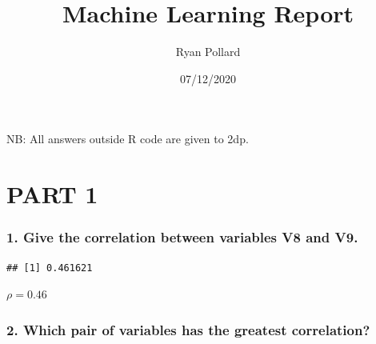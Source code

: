 \documentclass[
  8pt,
]{article}
\title{Machine Learning Report}
\author{Ryan Pollard}
\date{07/12/2020}
\newenvironment{Shaded}{\begin{snugshade}}{\end{snugshade}}
\newcommand{\KeywordTok}[1]{\textcolor[rgb]{0.13,0.29,0.53}{\textbf{#1}}}
\newcommand{\NormalTok}[1]{#1}
\newcommand{\OperatorTok}[1]{\textcolor[rgb]{0.81,0.36,0.00}{\textbf{#1}}}
\begin{document}
\maketitle

NB: All answers outside R code are given to 2dp.

\hypertarget{part-1}{%
\section{PART 1}\label{part-1}}

\newline

\hypertarget{give-the-correlation-between-variables-v8-and-v9.}{%
\subsubsection{1. Give the correlation between variables V8 and
V9.}\label{give-the-correlation-between-variables-v8-and-v9.}}

\begin{Shaded}
\end{Shaded}

\begin{verbatim}
## [1] 0.461621
\end{verbatim}

\(ρ = 0.46\)

\hypertarget{which-pair-of-variables-has-the-greatest-correlation}{%
\subsubsection{2. Which pair of variables has the greatest
correlation?}\label{which-pair-of-variables-has-the-greatest-correlation}}
\end{document}
